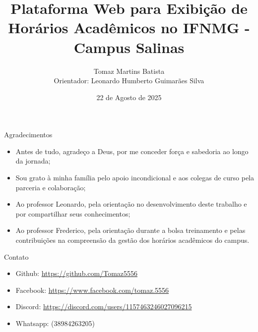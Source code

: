 \documentclass[handout,t]{beamer}
\title[Trabalho de Conclusão de Curso]{
	Plataforma Web para Exibição de Horários Acadêmicos no IFNMG - Campus Salinas}
\date{
	22 de Agosto de 2025}
\author[Autor: Tomaz Martins Batista]{
	Tomaz Martins Batista\\
	Orientador: Leonardo Humberto Guimarães Silva\\
	\vspace{0.5cm}}
\institute[]{
	Bacharelado em Sistemas de informação\\
	Instituto Federal do Norte de Minas Gerais - Campus Salinas\\
	\vspace{0.5cm}}
\begin{document}
\frame{\titlepage}
\section[]{}













%

\section{}
\begin{frame}{Agradecimentos}
	\begin{itemize}
		\item Antes de tudo, agradeço a Deus, por me conceder força e sabedoria ao longo da jornada; \vspace{0.5cm}
		\item Sou grato à minha família pelo apoio incondicional e aos colegas de curso pela parceria e colaboração; \vspace{0.5cm}
		\item Ao professor Leonardo, pela orientação no desenvolvimento deste trabalho e por compartilhar seus conhecimentos; \vspace{0.5cm}
		\item Ao professor Frederico, pela orientação durante a bolsa treinamento e pelas contribuições na compreensão da gestão dos horários acadêmicos do campus. \vspace{0.5cm}
	\end{itemize}
\end{frame}

\begin{frame}{Contato}
	\begin{itemize}
		\item Github: \url{https://github.com/Tomaz5556} \vspace{0.5cm}
		\item Facebook: \url{https://www.facebook.com/tomaz.5556} \vspace{0.5cm}
		\item Discord: \url{https://discord.com/users/1157463246027096215} \vspace{0.5cm}
		\item Whatsapp: (38984263205) \vspace{0.5cm}
	\end{itemize}
\end{frame}
\end{document}
